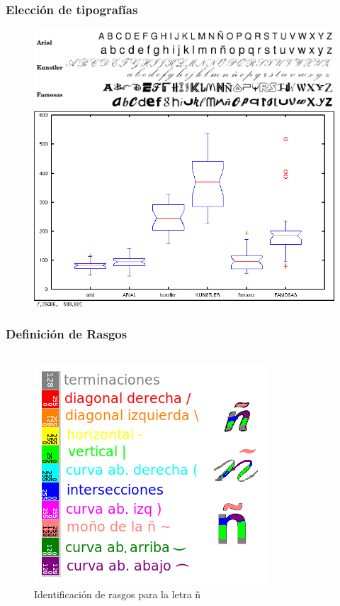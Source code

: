 \documentclass[10pt]{beamer}
\begin{document}
	\begin{frame}
	\frametitle{Elecci\'on de tipograf\'ias}
	    \begin{figure}
		\includegraphics[width=\textwidth]{graficos/letras.png}\\ \pause
		\includegraphics[width=0.8\textheight]{graficos/complejidadesBoxplot.png}
	    \end{figure}
	\end{frame}

	\begin{frame}
	\frametitle{Definici\'on de Rasgos}
	\begin{columns} [t]
	      \column{1\textwidth}
	      \begin{figure}
		  \includegraphics[height=.7\textheight]{graficos/REFERENCIA.png}
		  \caption{Identificaci\'on de rasgos para la letra \~n}
		  \end{figure}
	\end{columns}
	\end{frame}
\end{document}
